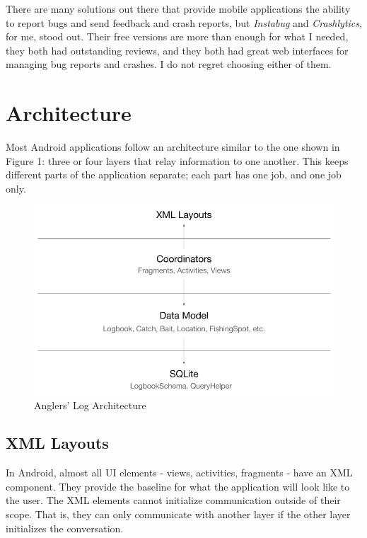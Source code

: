 \documentclass{article}
\begin{document}
	There are many solutions out there that provide mobile applications the ability to report bugs and send feedback and crash reports, but \textit{Instabug} and \textit{Crashlytics}, for me, stood out.  Their free versions are more than enough for what I needed, they both had outstanding reviews, and they both had great web interfaces for managing bug reports and crashes.  I do not regret choosing either of them.
	

	\section{Architecture}
	
	Most Android applications follow an architecture similar to the one shown in Figure 1:  three or four layers that relay information to one another.  This keeps different parts of the application separate; each part has one job, and one job only.
	
	\begin{figure}[h]
		\caption{Anglers' Log Architecture}
		\includegraphics[width=\textwidth]{architecture}
	\end{figure}


	\subsection{XML Layouts}
	
	In Android, almost all UI elements - views, activities, fragments - have an XML component.  They provide the baseline for what the application will look like to the user.  The XML elements cannot initialize communication outside of their scope.  That is, they can only communicate with another layer if the other layer initializes the conversation.
	
\end{document}
